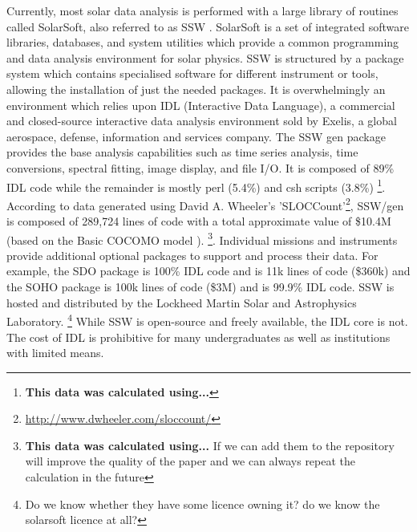 Currently, most solar data analysis is performed with a large library 
of routines called SolarSoft, also referred to as SSW 
\cite{freeland1998}. SolarSoft is a set of integrated software 
libraries, databases, and system utilities which provide a common 
programming and data analysis environment for solar physics. 
SSW is structured by a package system which contains
specialised software for different instrument or tools, 
allowing the installation of just the needed packages.
It is 
overwhelmingly an environment which relies upon IDL (Interactive Data 
Language), a commercial and closed-source interactive data analysis 
environment sold by Exelis, a global aerospace, defense, information 
and services company. The SSW gen package provides the base analysis 
capabilities such as time series analysis, time conversions, spectral 
fitting, image display, and file I/O. It is composed of 89\% IDL code 
while the remainder is mostly perl (5.4\%) and csh scripts (3.8\%)
\footnote{{\bf This data was calculated using...}}. 
According to data generated using David A. Wheeler's 'SLOCCount'\footnote{
\url{http://www.dwheeler.com/sloccount/}}, 
SSW/gen is composed of 289,724 lines of code with a total approximate 
value of \$10.4M (based on the Basic COCOMO model \cite{_cocomo_2014}).
\footnote{{\bf This data was calculated using...} If we can add them to the
repository will improve the quality of the paper and we can always repeat the calculation in the future}. 
Individual 
missions and instruments provide additional optional packages to 
support and process their data. For example, the SDO package 
\cite{sdo} is 100\% IDL code and is 11k lines of code (\$360k) 
and the SOHO package \cite{soho} is 100k lines of code (\$3M) and is 
99.9\% IDL code. SSW is hosted and distributed by the Lockheed Martin 
Solar and Astrophysics Laboratory.
\footnote{Do we know whether they have some licence owning it? do we know the solarsoft licence at all?}
While SSW is open-source and freely available, the IDL core is not. The cost 
of IDL is prohibitive for many undergraduates as well as institutions 
with limited means. 

